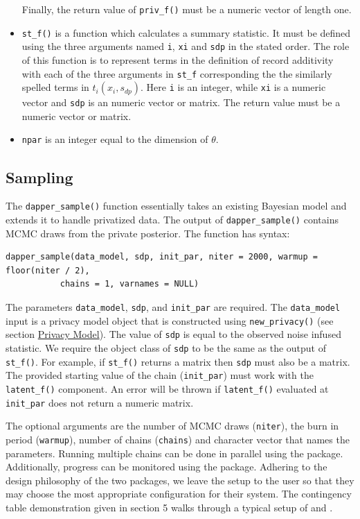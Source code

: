 \begin{itemize}
  Finally, the return value of \texttt{priv\_f()} must be a numeric vector of length one.
\item
  \texttt{st\_f()} is a function which calculates a summary statistic. It
  must be defined using the three arguments named \texttt{i}, \texttt{xi} and \texttt{sdp}
  in the stated order. The role of this function is to represent terms in the definition of record additivity
  with each of the three arguments in \texttt{st\_f} corresponding the the similarly spelled
  terms in \(t_i(x_i, s_{dp})\). Here \texttt{i} is an integer,
  while \texttt{xi} is a numeric vector and \texttt{sdp} is an numeric vector or matrix. The return value
  must be a numeric vector or matrix.
\item
  \texttt{npar} is an integer equal to the dimension of \(\theta\).
\end{itemize}

\hypertarget{sampling}{%
\subsection{Sampling}\label{sampling}}

The \texttt{dapper\_sample()} function essentially takes an existing
Bayesian model and extends it to handle privatized data. The
output of \texttt{dapper\_sample()} contains MCMC draws from
the private posterior. The function has syntax:

\begin{verbatim}
dapper_sample(data_model, sdp, init_par, niter = 2000, warmup = floor(niter / 2),
           chains = 1, varnames = NULL)
\end{verbatim}

The parameters \texttt{data\_model}, \texttt{sdp}, and \texttt{init\_par} are required.
The \texttt{data\_model} input is a privacy model object that is constructed
using \texttt{new\_privacy()} (see section \protect\hyperlink{privacy-model}{Privacy Model}). The value
of \texttt{sdp} is equal to the observed noise infused statistic. We require the
object class of \texttt{sdp} to be the same as the output of \texttt{st\_f()}.
For example, if \texttt{st\_f()} returns a matrix
then \texttt{sdp} must also be a matrix. The provided starting value of the
chain (\texttt{init\_par}) must work with the \texttt{latent\_f()} component. An
error will be thrown if \texttt{latent\_f()} evaluated at \texttt{init\_par} does
not return a numeric matrix.

The optional arguments are the number of MCMC draws (\texttt{niter}), the
burn in period (\texttt{warmup}), number of chains (\texttt{chains}) and character
vector that names the parameters. Running multiple chains can be done in parallel
using the  package. Additionally, progress can be monitored
using the  package. Adhering to the design philosophy
of the two packages, we leave the setup to the user so that they may
choose the most appropriate configuration for their system. The
contingency table demonstration given in section 5 walks
through a typical setup of  and .

